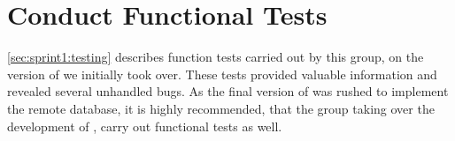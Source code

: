 \section{Conduct Functional Tests}
\cref{sec:sprint1:testing} describes function tests carried out by this group, on the version of \launcher we initially took over.
These tests provided valuable information and revealed several unhandled bugs.
As the final version of \launcher was rushed to implement the remote database, it is highly recommended, that the group taking over the development of \launcher, carry out functional tests as well.